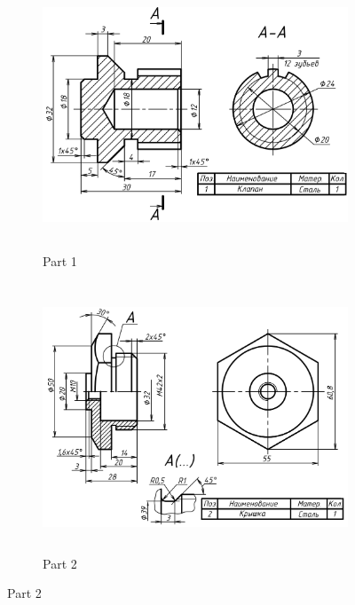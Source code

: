\documentclass[12pt]{article}
\begin{document}
\begin{figure}[H]
    \begin{subfigure}{0.49\textwidth}
        \centering\includegraphics[height=8cm,width=1\textwidth,keepaspectratio]{resources_CAD/global_var1/t1.png}
        \caption{Part 1}
        \label{fig:resources_CAD/global_var1/t1.png}
    \end{subfigure}
    \begin{subfigure}{0.49\textwidth}
        \centering\includegraphics[height=8cm,width=1\textwidth,keepaspectratio]{resources_CAD/global_var1/t2.png}
        \caption{Part 2}
        \label{fig:resources_CAD/global_var1/t2.png}
    \end{subfigure}


\end{figure}
\end{document}
